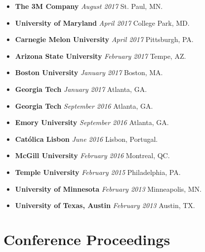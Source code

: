 \documentclass[10.5pt,letterpaper,sans]{moderncv}        %
\begin{document}
\begin{itemize}
\item \textbf{The 3M Company} \textit{August 2017} St. Paul, MN.
\item \textbf{University of Maryland} \textit{April 2017} College Park, MD.
\item \textbf{Carnegie Melon University} \textit{April 2017} Pittsburgh, PA.
\item \textbf{Arizona State University} \textit{February 2017} Tempe, AZ.
\item \textbf{Boston University} \textit{January 2017} Boston, MA.
\item \textbf{Georgia Tech} \textit{January 2017} Atlanta, GA.
\item \textbf{Georgia Tech} \textit{September 2016} Atlanta, GA.
\item \textbf{Emory University} \textit{September 2016} Atlanta, GA.
\item \textbf{Cat\'olica Lisbon} \textit{June 2016} Lisbon, Portugal.
\item \textbf{McGill University} \textit{February 2016} Montreal, QC.
\item \textbf{Temple University} \textit{February 2015} Philadelphia, PA.
\item \textbf{University of Minnesota} \textit{February 2013} Minneapolis, MN.
\item \textbf{University of Texas, Austin} \textit{February 2013} Austin, TX.

\end{itemize}

\section{Conference Proceedings}
\end{document}
